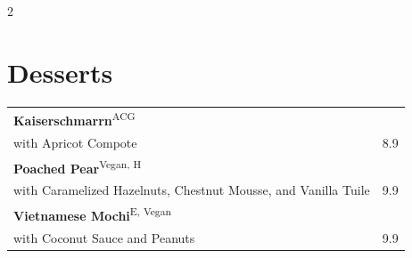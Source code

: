 \documentclass[a4paper,12pt]{article}
\begin{document}
\begin{multicols}{2}
\section*{Desserts}
\begin{tabular}{p{6cm}r}
\textbf{Kaiserschmarrn}\textsuperscript{{\scriptsize ACG}}\\
\scriptsize with Apricot Compote & 8.9\\
\textbf{Poached Pear}\textsuperscript{{\scriptsize Vegan, H}}\\
\scriptsize with Caramelized Hazelnuts, Chestnut Mousse, and Vanilla Tuile & 9.9\\
\textbf{Vietnamese Mochi}\textsuperscript{{\scriptsize E, Vegan}}\\
\scriptsize with Coconut Sauce and Peanuts & 9.9 \\
\end{tabular}



\end{multicols}
\end{document}
